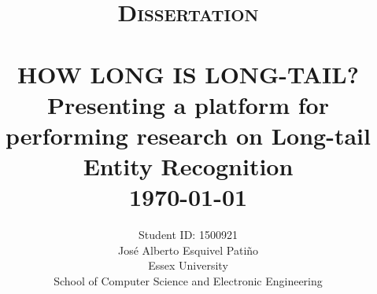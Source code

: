 \title{ \normalsize \textsc{Dissertation}
		\\ [2.0cm]
		\HRule{0.5pt} \\
		\LARGE \textbf{\uppercase{How long is long-tail?}} \\ 
		Presenting a platform for performing research on Long-tail Entity Recognition 
		\HRule{2pt} \\ [0.5cm]
        \normalsize \today \vspace*{5\baselineskip}}
\date{}

\author{
		Student ID: 1500921 \\ 
        José Alberto Esquivel Patiño \\
		Essex University \\
		School of Computer Science and Electronic Engineering }


\maketitle

\newpage

\tableofcontents

